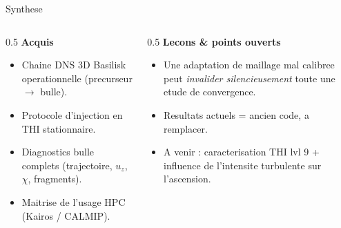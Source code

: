 \documentclass[11pt,aspectratio=169]{beamer}
\begin{document}
\begin{frame}{Synthese}
  \begin{columns}[T]
    \begin{column}{0.5\textwidth}
      \textbf{Acquis}
      \begin{itemize}
        \item Chaine DNS 3D Basilisk operationnelle (precurseur $\to$ bulle).
        \item Protocole d'injection en THI stationnaire.
        \item Diagnostics bulle complets (trajectoire, $u_z$, $\chi$, fragments).
        \item Maitrise de l'usage HPC (Kairos / CALMIP).
      \end{itemize}
    \end{column}
    \begin{column}{0.5\textwidth}
      \textbf{Lecons \& points ouverts}
      \begin{itemize}
        \item Une adaptation de maillage mal calibree peut \emph{invalider
              silencieusement} toute une etude de convergence.
        \item Resultats actuels = \textcolor{warnred}{ancien code}, a remplacer.
        \item A venir : caracterisation THI lvl 9 + influence de l'intensite
              turbulente sur l'ascension.
      \end{itemize}
    \end{column}
  \end{columns}
\end{frame}

\end{document}
